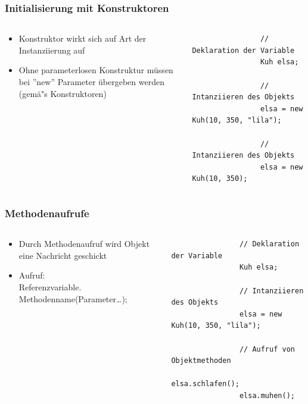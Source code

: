 \begin{frame}[fragile]
	\frametitle{Initialisierung mit Konstruktoren}
	\begin{columns}
		\begin{column}{0.5\textwidth}
			\small
			\begin{itemize}
			  \item Konstruktor wirkt sich auf Art der 
			  Instanziierung auf
			  \item Ohne parameterlosen Konstruktur m\"ussen 
			  bei ''new'' Parameter \"ubergeben werden\\
			  (gem\"a"s Konstruktoren)
			\end{itemize}
		\end{column}
		\begin{column}{0.5\textwidth}
			\begin{lstlisting}
				// Deklaration der Variable
				Kuh elsa;
				
				// Intanziieren des Objekts
				elsa = new Kuh(10, 350, "lila");
				
				// Intanziieren des Objekts
				elsa = new Kuh(10, 350);
			\end{lstlisting}
		\end{column}
	\end{columns}
\end{frame}

\begin{frame}[fragile]
	\frametitle{Methodenaufrufe}
	\begin{columns}
		\begin{column}{0.6\textwidth}
			\small
			\begin{itemize}
			  \item Durch Methodenaufruf wird Objekt 
			  eine Nachricht geschickt
			  \item Aufruf:\\
			  Referenzvariable.\\
			  Methodenname(Parameter\ldots);
			\end{itemize}
		\end{column}
		\begin{column}{0.4\textwidth}
			\begin{lstlisting}
				// Deklaration der Variable
				Kuh elsa;
				
				// Intanziieren des Objekts
				elsa = new Kuh(10, 350, "lila");
				
				// Aufruf von Objektmethoden
				elsa.schlafen();
				elsa.muhen();
			\end{lstlisting}
		\end{column}
	\end{columns}
\end{frame}

